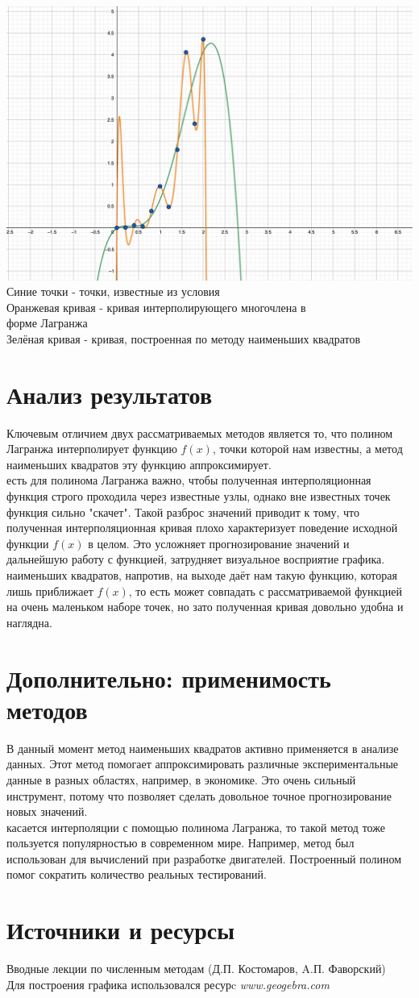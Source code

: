 \documentclass[a4paper, 14pt]{extreport}
\begin{document}
\includegraphics[width =\textwidth]{graphic}
Синие точки - точки, известные из условия \\
Оранжевая кривая - кривая интерполирующего многочлена в \\ форме Лагранжа \\
Зелёная кривая - кривая, построенная по методу наименьших квадратов

\section*{Анализ результатов}
\;\;\;\;\;\;Ключевым отличием двух рассматриваемых методов является то, что полином Лагранжа интерполирует функцию $f(x)$, точки которой нам известны, а метод наименьших квадратов эту функцию аппроксимирует. \\
 есть для полинома Лагранжа важно, чтобы полученная интерполяционная функция строго проходила через известные узлы, однако вне известных точек функция сильно "скачет". Такой разброс значений приводит к тому, что полученная интерполяционная кривая плохо характеризует поведение исходной функции $f(x)$ в целом. Это усложняет прогнозирование значений и дальнейшую работу с функцией, затрудняет визуальное восприятие графика.\\
 наименьших квадратов, напротив, на выходе даёт нам такую функцию, которая лишь приближает $f(x)$, то есть может совпадать с рассматриваемой функцией на очень маленьком наборе точек, но зато полученная кривая довольно удобна и наглядна. 

\section*{Дополнительно: применимость методов}
\;\;\;\;\;\;В данный момент метод наименьших квадратов активно применяется в анализе данных. Этот метод помогает аппроксимировать различные экспериментальные данные в разных областях, например, в экономике. Это очень сильный инструмент, потому что позволяет сделать довольное точное прогнозирование новых значений. \\
 касается интерполяции с помощью полинома Лагранжа, то такой метод тоже пользуется популярностью в современном мире. Например, метод был использован для вычислений при разработке двигателей. Построенный полином помог сократить количество реальных тестирований.

\section*{Источники и ресурсы}
Вводные лекции по численным методам (Д.П. Костомаров, A.П. Фаворский) \\
Для построения графика использовался ресурc \textit{www.geogebra.com}
\end{document}
